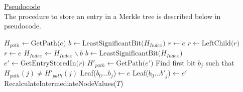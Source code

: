 \documentclass[11pt]{article}
\begin{document}
\underline{Pseudocode}\\

The procedure to store an entry in a Merkle tree is described below in pseudocode. 

\begin{algorithm}
	\begin{algorithmic}[1]
		\State $H_{path} \gets \text{GetPath($e$)}$
		\State $b \gets \text{LeastSignificantBit($H_{Index}$)}$
		 $r \gets e$
		\Else
		 {$r \gets \text{LeftChild($r$)}$}
		\EndIf
		\State $r \gets e$
		\State $H_{Index} \gets H_{Index}\backslash{b}$
		\State $b \gets \text{LeastSignificantBit($H_{Index}$)}$
		\EndIf	
		\EndWhile
		\EndIf
		\State $e' \gets \text{GetEntryStoredIn($r$)}$
		\State $H'_{path} \gets \text{GetPath($e'$)}$
		\State Find first bit $b_j$ such that $H_{path}(j) \not= H'_{path}(j)$
		\State Leaf($b_0...b_j$)$\gets e$ %
		\State Leaf($b_0...b'_j$)$\gets e'$ %
		\State RecalculateIntermediateNodeValues($T$)	
		\EndIf
		\EndProcedure
	\end{algorithmic}
\end{algorithm}


%
%
%


%
\end{document}
